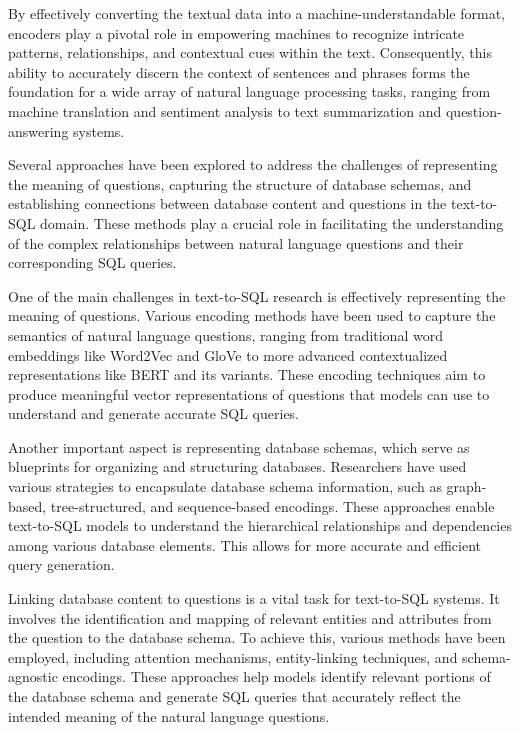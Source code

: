By effectively converting the textual data into a machine-understandable format, encoders play a pivotal role in empowering machines to recognize intricate patterns, relationships, and contextual cues within the text. Consequently, this ability to accurately discern the context of sentences and phrases forms the foundation for a wide array of natural language processing tasks, ranging from machine translation and sentiment analysis to text summarization and question-answering systems.

Several approaches have been explored to address the challenges of representing the meaning of questions, capturing the structure of database schemas, and establishing connections between database content and questions in the text-to-SQL domain\cite{deng2022recent}. These methods play a crucial role in facilitating the understanding of the complex relationships between natural language questions and their corresponding SQL queries.

One of the main challenges in text-to-SQL research is effectively representing the meaning of questions. Various encoding methods have been used to capture the semantics of natural language questions, ranging from traditional word embeddings like Word2Vec and GloVe to more advanced contextualized representations like BERT and its variants. These encoding techniques aim to produce meaningful vector representations of questions that models can use to understand and generate accurate SQL queries.

Another important aspect is representing database schemas, which serve as blueprints for organizing and structuring databases. Researchers have used various strategies to encapsulate database schema information, such as graph-based, tree-structured, and sequence-based encodings. These approaches enable text-to-SQL models to understand the hierarchical relationships and dependencies among various database elements. This allows for more accurate and efficient query generation.

Linking database content to questions is a vital task for text-to-SQL systems\cite{deng2022recent}. It involves the identification and mapping of relevant entities and attributes from the question to the database schema. To achieve this, various methods have been employed, including attention mechanisms, entity-linking techniques, and schema-agnostic encodings. These approaches help models identify relevant portions of the database schema and generate SQL queries that accurately reflect the intended meaning of the natural language questions.

